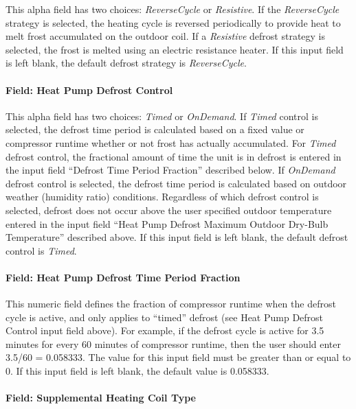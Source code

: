 This alpha field has two choices: \emph{ReverseCycle} or \emph{Resistive}. If the \emph{ReverseCycle} strategy is selected, the heating cycle is reversed periodically to provide heat to melt frost accumulated on the outdoor coil. If a \emph{Resistive} defrost strategy is selected, the frost is melted using an electric resistance heater. If this input field is left blank, the default defrost strategy is \emph{ReverseCycle}.

\paragraph{Field: Heat Pump Defrost Control}\label{field-heat-pump-defrost-control-1}

This alpha field has two choices: \emph{Timed} or \emph{OnDemand}. If \emph{Timed} control is selected, the defrost time period is calculated based on a fixed value or compressor runtime whether or not frost has actually accumulated. For \emph{Timed} defrost control, the fractional amount of time the unit is in defrost is entered in the input field ``Defrost Time Period Fraction'' described below. If \emph{OnDemand} defrost control is selected, the defrost time period is calculated based on outdoor weather (humidity ratio) conditions. Regardless of which defrost control is selected, defrost does not occur above the user specified outdoor temperature entered in the input field ``Heat Pump Defrost Maximum Outdoor Dry-Bulb Temperature'' described above. If this input field is left blank, the default defrost control is \emph{Timed}.

\paragraph{Field: Heat Pump Defrost Time Period Fraction}\label{field-heat-pump-defrost-time-period-fraction-1}

This numeric field defines the fraction of compressor runtime when the defrost cycle is active, and only applies to ``timed'' defrost (see Heat Pump Defrost Control input field above). For example, if the defrost cycle is active for 3.5 minutes for every 60 minutes of compressor runtime, then the user should enter 3.5/60 = 0.058333. The value for this input field must be greater than or equal to 0. If this input field is left blank, the default value is 0.058333.

\paragraph{Field: Supplemental Heating Coil Type}\label{field-supplemental-heating-coil-type-2}

